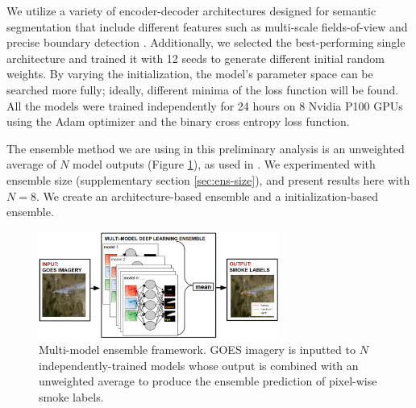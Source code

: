 \documentclass{article}
\begin{document}
We utilize a variety of encoder-decoder architectures designed for semantic segmentation that include different features such as multi-scale fields-of-view and precise boundary detection \citep{dlv3p,PAN,UNetpp}. Additionally, we selected the best-performing single architecture and trained it with 12 seeds to generate different initial random weights. By varying the initialization, the model's parameter space can be searched more fully; ideally, different minima of the loss function will be found. All the models were trained independently for 24 hours on 8 Nvidia P100 GPUs using the Adam optimizer and the binary cross entropy loss function. 

The ensemble method we are using in this preliminary analysis is an unweighted average of $N$ model outputs (Figure \ref{fig:ensemble_framework}), as used in \citep{nn-ensemble2}. We experimented with ensemble size (supplementary section \ref{sec:ens-size}), and present results here with $N=8$. We create an architecture-based ensemble and a initialization-based ensemble.


\begin{figure}
    \centering
    \includegraphics[width=0.7\textwidth]{ensemble_framework.png}
    \caption{\RaggedRight Multi-model ensemble framework. GOES imagery is inputted to $N$ independently-trained models whose output is combined with an unweighted average to produce the ensemble prediction of pixel-wise smoke labels.}
    \label{fig:ensemble_framework}
\end{figure}
\end{document}
